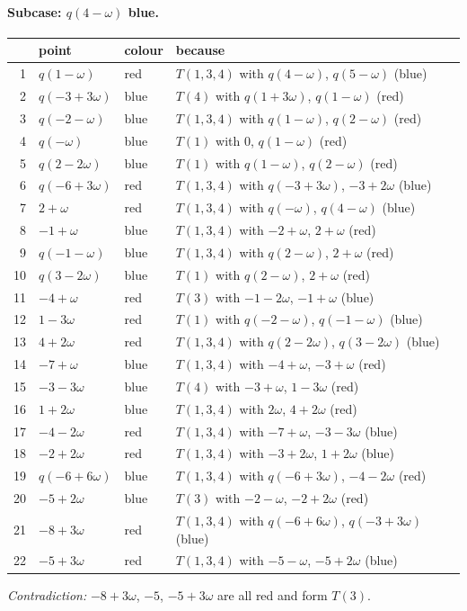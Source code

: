 \paragraph{Subcase: $q(4-\omega)$ blue.}
\begin{center}\small\begin{longtable}{rlll}\toprule & point & colour & because\\\midrule\endhead
1 & $q(1-\omega)$ & red & $T(1,3,4)$ with $q(4-\omega)$, $q(5-\omega)$ (blue)\\
2 & $q(-3+3\omega)$ & blue & $T(4)$ with $q(1+3\omega)$, $q(1-\omega)$ (red)\\
3 & $q(-2-\omega)$ & blue & $T(1,3,4)$ with $q(1-\omega)$, $q(2-\omega)$ (red)\\
4 & $q(-\omega)$ & blue & $T(1)$ with $0$, $q(1-\omega)$ (red)\\
5 & $q(2-2\omega)$ & blue & $T(1)$ with $q(1-\omega)$, $q(2-\omega)$ (red)\\
6 & $q(-6+3\omega)$ & red & $T(1,3,4)$ with $q(-3+3\omega)$, $-3+2\omega$ (blue)\\
7 & $2+\omega$ & red & $T(1,3,4)$ with $q(-\omega)$, $q(4-\omega)$ (blue)\\
8 & $-1+\omega$ & blue & $T(1,3,4)$ with $-2+\omega$, $2+\omega$ (red)\\
9 & $q(-1-\omega)$ & blue & $T(1,3,4)$ with $q(2-\omega)$, $2+\omega$ (red)\\
10 & $q(3-2\omega)$ & blue & $T(1)$ with $q(2-\omega)$, $2+\omega$ (red)\\
11 & $-4+\omega$ & red & $T(3)$ with $-1-2\omega$, $-1+\omega$ (blue)\\
12 & $1-3\omega$ & red & $T(1)$ with $q(-2-\omega)$, $q(-1-\omega)$ (blue)\\
13 & $4+2\omega$ & red & $T(1,3,4)$ with $q(2-2\omega)$, $q(3-2\omega)$ (blue)\\
14 & $-7+\omega$ & blue & $T(1,3,4)$ with $-4+\omega$, $-3+\omega$ (red)\\
15 & $-3-3\omega$ & blue & $T(4)$ with $-3+\omega$, $1-3\omega$ (red)\\
16 & $1+2\omega$ & blue & $T(1,3,4)$ with $2\omega$, $4+2\omega$ (red)\\
17 & $-4-2\omega$ & red & $T(1,3,4)$ with $-7+\omega$, $-3-3\omega$ (blue)\\
18 & $-2+2\omega$ & red & $T(1,3,4)$ with $-3+2\omega$, $1+2\omega$ (blue)\\
19 & $q(-6+6\omega)$ & blue & $T(1,3,4)$ with $q(-6+3\omega)$, $-4-2\omega$ (red)\\
20 & $-5+2\omega$ & blue & $T(3)$ with $-2-\omega$, $-2+2\omega$ (red)\\
21 & $-8+3\omega$ & red & $T(1,3,4)$ with $q(-6+6\omega)$, $q(-3+3\omega)$ (blue)\\
22 & $-5+3\omega$ & red & $T(1,3,4)$ with $-5-\omega$, $-5+2\omega$ (blue)\\
\bottomrule\end{longtable}\end{center}
\noindent\emph{Contradiction:} $-8+3\omega$, $-5$, $-5+3\omega$ are all red and form $T(3)$.\par\medskip
